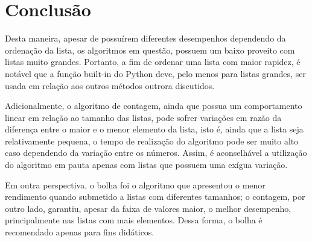 \section{Conclusão}
Desta maneira, apesar de possuírem diferentes desempenhos dependendo da ordenação da lista, os algoritmos em questão, possuem um baixo proveito com listas muito grandes. Portanto, a fim de ordenar uma lista com maior rapidez, é notável que a função built-in do Python deve, pelo menos para listas grandes, ser usada em relação aos outros métodos outrora discutidos.

Adicionalmente, o algoritmo de contagem, ainda que possua um comportamento linear em relação ao tamanho das listas, pode sofrer variações em razão da diferença entre o maior e o menor elemento da lista, isto é, ainda que a lista seja relativamente pequena, o tempo de realização do algoritmo pode ser muito alto caso dependendo da variação entre os números. Assim, é aconselhável a utilização do algoritmo em pauta apenas com listas que possuem uma exígua variação.

Em outra perspectiva, o bolha foi o algoritmo que apresentou o menor rendimento quando submetido a listas com diferentes tamanhos; o contagem, por outro lado, garantiu, apesar da faixa de valores maior, o melhor desempenho, principalmente nas listas com mais elementos. Dessa forma, o bolha é recomendado apenas para fins didáticos.